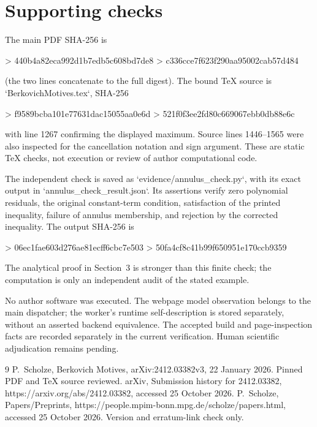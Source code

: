 \documentclass[10pt]{article}
\begin{document}
\section*{Supporting checks}
The main PDF SHA-256 is\par
> 440b4a82eca992d1b7edb5c608bd7de8
> c336cce7f623f290aa95002cab57d484\par
(the two lines concatenate to the full digest). The bound TeX source is `BerkovichMotives.tex`, SHA-256\par
> f9589bcba101e77631dac15055aa0e6d
> 521f0f3ee2fd80c669067ebb0db88e6c\par
with line 1267 confirming the displayed maximum. Source lines 1446–1565 were also inspected for the cancellation notation and sign argument. These are static TeX checks, not execution or review of author computational code.\par
The independent check is saved as `evidence/annulus\_check.py`, with its exact output in `annulus\_check\_result.json`. Its assertions verify zero polynomial residuals, the original constant-term condition, satisfaction of the printed inequality, failure of annulus membership, and rejection by the corrected inequality. The output SHA-256 is\par
> 06ec1fae603d276ae81ecff6cbc7e503
> 50fa4cf8c41b99f650951e170ccb9359\par
The analytical proof in Section 3 is stronger than this finite check; the computation is only an independent audit of the stated example.\par
No author software was executed. The webpage model observation belongs to the main dispatcher; the worker’s runtime self-description is stored separately, without an asserted backend equivalence. The accepted build and page-inspection facts are recorded separately in the current verification. Human scientific adjudication remains pending.\par
9 P. Scholze, Berkovich Motives, arXiv:2412.03382v3, 22 January 2026. Pinned PDF and TeX source reviewed. arXiv, Submission history for 2412.03382, https://arxiv.org/abs/2412.03382, accessed 25 October 2026. P. Scholze, Papers/Preprints, https://people.mpim-bonn.mpg.de/scholze/papers.html, accessed 25 October 2026. Version and erratum-link check only.\par
\end{document}
